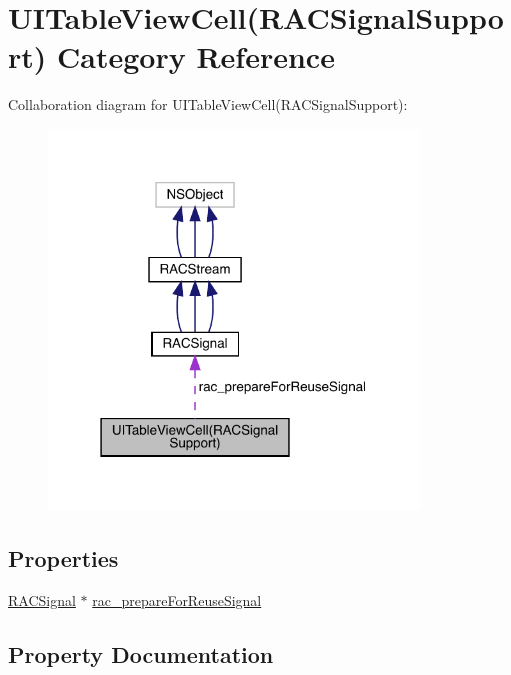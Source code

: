 \hypertarget{category_u_i_table_view_cell_07_r_a_c_signal_support_08}{}\section{U\+I\+Table\+View\+Cell(R\+A\+C\+Signal\+Support) Category Reference}
\label{category_u_i_table_view_cell_07_r_a_c_signal_support_08}


Collaboration diagram for U\+I\+Table\+View\+Cell(R\+A\+C\+Signal\+Support)\+:\nopagebreak
\begin{figure}[H]
\begin{center}
\leavevmode
\includegraphics[width=279pt]{category_u_i_table_view_cell_07_r_a_c_signal_support_08__coll__graph}
\end{center}
\end{figure}
\subsection*{Properties}
\begin{DoxyCompactItemize}
\item 
\mbox{\hyperlink{interface_r_a_c_signal}{R\+A\+C\+Signal}} $\ast$ \mbox{\hyperlink{category_u_i_table_view_cell_07_r_a_c_signal_support_08_abf7e713400bcd097552c1663681713e8}{rac\+\_\+prepare\+For\+Reuse\+Signal}}
\end{DoxyCompactItemize}


\subsection{Property Documentation}
\mbox{\label{category_u_i_table_view_cell_07_r_a_c_signal_support_08_abf7e713400bcd097552c1663681713e8}} 
